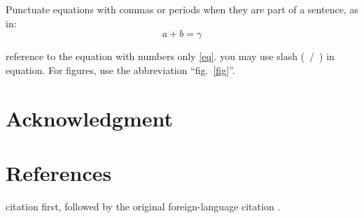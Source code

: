 \documentclass[conference]{IEEEtran}
\begin{document}
Punctuate equations with commas or periods when they are part of a sentence, as in:
\begin{equation}
a+b=\gamma\label{eq}
\end{equation}

reference to the equation with numbers only \eqref{eq}.
you may use slash (~/~) in equation.
For figures, use the abbreviation ``fig.~\ref{fig}''.


\section*{Acknowledgment}

\section*{References}

citation first, followed by the original foreign-language citation \cite{b6}.



\end{document}
